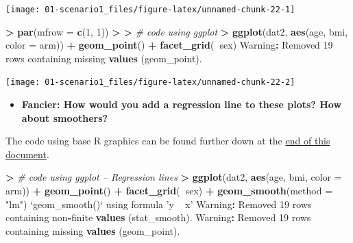 \documentclass[
]{book}
\newenvironment{Shaded}{\begin{snugshade}}{\end{snugshade}}
\newcommand{\CommentTok}[1]{\textcolor[rgb]{0.56,0.35,0.01}{\textit{#1}}}
\newcommand{\DataTypeTok}[1]{\textcolor[rgb]{0.13,0.29,0.53}{#1}}
\newcommand{\DecValTok}[1]{\textcolor[rgb]{0.00,0.00,0.81}{#1}}
\newcommand{\ErrorTok}[1]{\textcolor[rgb]{0.64,0.00,0.00}{\textbf{#1}}}
\newcommand{\KeywordTok}[1]{\textcolor[rgb]{0.13,0.29,0.53}{\textbf{#1}}}
\newcommand{\NormalTok}[1]{#1}
\newcommand{\OperatorTok}[1]{\textcolor[rgb]{0.81,0.36,0.00}{\textbf{#1}}}
\newcommand{\StringTok}[1]{\textcolor[rgb]{0.31,0.60,0.02}{#1}}
\providecommand{\tightlist}{%
  \setlength{\itemsep}{0pt}\setlength{\parskip}{0pt}}
\begin{document}
\begin{center}\texttt{[image: 01-scenario1\_files/figure-latex/unnamed-chunk-22-1]} \end{center}

\begin{Shaded}
\begin{Highlighting}[]
\OperatorTok{>}\StringTok{ }\KeywordTok{par}\NormalTok{(}\DataTypeTok{mfrow =} \KeywordTok{c}\NormalTok{(}\DecValTok{1}\NormalTok{, }\DecValTok{1}\NormalTok{))}
\OperatorTok{>}\StringTok{ }
\ErrorTok{>}\StringTok{ }\CommentTok{# code using ggplot}
\ErrorTok{>}\StringTok{ }\KeywordTok{ggplot}\NormalTok{(dat2, }\KeywordTok{aes}\NormalTok{(age, bmi, }\DataTypeTok{color =}\NormalTok{ arm)) }\OperatorTok{+}\StringTok{ }\KeywordTok{geom_point}\NormalTok{() }\OperatorTok{+}\StringTok{ }\KeywordTok{facet_grid}\NormalTok{(}\OperatorTok{~}\NormalTok{sex)}
\NormalTok{Warning}\OperatorTok{:}\StringTok{ }\NormalTok{Removed }\DecValTok{19}\NormalTok{ rows containing missing }\KeywordTok{values}\NormalTok{ (geom_point).}
\end{Highlighting}
\end{Shaded}

\begin{center}\texttt{[image: 01-scenario1\_files/figure-latex/unnamed-chunk-22-2]} \end{center}

\begin{itemize}
\tightlist
\item
  \textbf{Fancier: How would you add a regression line to these plots? How about smoothers?}
\end{itemize}

The code using base R graphics can be found further down at the \protect\hyperlink{alt-plot}{end of this document}.

\begin{Shaded}
\begin{Highlighting}[]
\OperatorTok{>}\StringTok{ }\CommentTok{# code using ggplot -- Regression lines}
\ErrorTok{>}\StringTok{ }\KeywordTok{ggplot}\NormalTok{(dat2, }\KeywordTok{aes}\NormalTok{(age, bmi, }\DataTypeTok{color =}\NormalTok{ arm)) }\OperatorTok{+}\StringTok{ }\KeywordTok{geom_point}\NormalTok{() }\OperatorTok{+}\StringTok{ }\KeywordTok{facet_grid}\NormalTok{(}\OperatorTok{~}\NormalTok{sex) }\OperatorTok{+}\StringTok{ }\KeywordTok{geom_smooth}\NormalTok{(}\DataTypeTok{method =} \StringTok{"lm"}\NormalTok{)}
\StringTok{`}\DataTypeTok{geom_smooth()}\StringTok{`}\NormalTok{ using formula }\StringTok{'y ~ x'}
\NormalTok{Warning}\OperatorTok{:}\StringTok{ }\NormalTok{Removed }\DecValTok{19}\NormalTok{ rows containing non}\OperatorTok{-}\NormalTok{finite }\KeywordTok{values}\NormalTok{ (stat_smooth).}
\NormalTok{Warning}\OperatorTok{:}\StringTok{ }\NormalTok{Removed }\DecValTok{19}\NormalTok{ rows containing missing }\KeywordTok{values}\NormalTok{ (geom_point).}
\end{Highlighting}
\end{Shaded}
\end{document}
